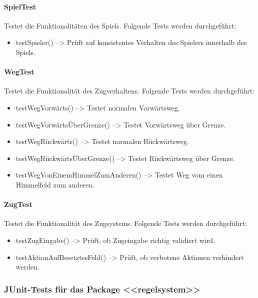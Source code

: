\documentclass[12pt,halfparskip]{scrartcl}
\begin{document}
	\paragraph{SpielTest}\label{ssub:spieltest} %
	Testet die Funktionalitäten des Spiels. Folgende Tests werden durchgeführt:
	\begin{itemize}
		\item testSpieler() --> Prüft auf konsistentes Verhalten des Spielers innerhalb des Spiels.
	\end{itemize}
	\paragraph{WegTest}\label{ssub:wegtest} %
	Testet die Funktionalität des Zugverhaltens. Folgende Tests werden durchgeführt:
	\begin{itemize}
		\item testWegVorwärts() --> Testet normalen Vorwärtsweg.
		\item testWegVorwärtsÜberGrenze() --> Testet Vorwärtsweg über Grenze.
		\item testWegRückwärts() --> Testet normalen Rückwärtsweg.
		\item testWegRückwärtsÜberGrenze() --> Testet Rückwärtsweg über Grenze.
		\item testWegVonEinemHimmelZumAnderen() --> Testet Weg vom einen Himmelfeld zum anderen.
	\end{itemize}
	\paragraph{ZugTest}\label{ssub:zugtest} %
	Testet die Funktionalität des Zugsystems. Folgende Tests werden durchgeführt:
	\begin{itemize}
		\item testZugEingabe() --> Prüft, ob Zugeingabe richtig validiert wird.
		\item testAktionAufBesetztesFeld() --> Prüft, ob verbotene Aktionen verhindert werden.
	\end{itemize}
	\subsubsection{JUnit-Tests für das Package <<regelsystem>>}\label{ssub:junit_tests_für_das_package_regelsystem_} %
\end{document}
